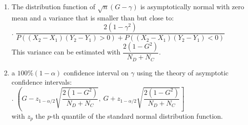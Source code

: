 \begin{enumerate}
    \item The distribution function of $\sqrt{n}(G - \gamma)$ is asymptotically normal with zero mean and a variance that is smaller than but close to:
    \hfill \cite{statistics/book/Statistics-for-Data-Scientists/Maurits-Kaptein}
    \\[0.3cm]
    .\hfill
    $
        \dfrac{
            2(1 - \gamma^2)
        }{
            P((X_2 - X_1)(Y_2 - Y_1) > 0) + P((X_2 - X_1)(Y_2 - Y_1) < 0)
        }
    $
    \hfill \cite{statistics/book/Statistics-for-Data-Scientists/Maurits-Kaptein}
    \\[0.3cm]
    This variance can be estimated with $\dfrac{2(1 - G^2)}{N_D + N_C}$.
    \hfill \cite{statistics/book/Statistics-for-Data-Scientists/Maurits-Kaptein}

    \item a $100\%(1 - \alpha)$ confidence interval on $\gamma$ using the theory of asymptotic confidence intervals:
    \hfill \cite{statistics/book/Statistics-for-Data-Scientists/Maurits-Kaptein}
    \\[0.3cm]
    .\hfill
    $
        \left(
            G - z_{1-\alpha/2} \sqrt{\dfrac{2(1 - G^2)}{N_D + N_C}},
            \ G + z_{1-\alpha/2} \sqrt{\dfrac{2(1 - G^2)}{N_D + N_C}}
        \right]
    $
    \hfill \cite{statistics/book/Statistics-for-Data-Scientists/Maurits-Kaptein}
    \\[0.3cm]
    with $z_p$ the $p$-th quantile of the standard normal distribution function.
    \hfill \cite{statistics/book/Statistics-for-Data-Scientists/Maurits-Kaptein}
\end{enumerate}
































